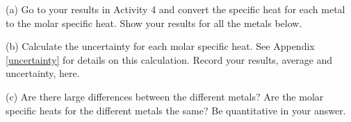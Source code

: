 (a) Go to your results in Activity 4 and convert the specific heat for each metal 
to the molar specific heat. Show your results for all the metals below.

\answerspace{3cm}

(b) Calculate the uncertainty for each molar specific heat. See Appendix \ref{uncertainty} for
details on this calculation. Record your results, average and uncertainty, here.

\answerspace{3cm}

(c) Are there large differences between the different metals?
Are the molar specific heats for the different metals the same?
Be quantitative in your answer.

\answerspace{3cm}




